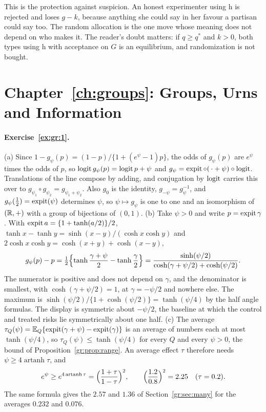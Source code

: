 This is the protection against suspicion. An honest experimenter using h is rejected and loses $g-k$, because anything she could say in her favour a partisan could say too. The random allocation is the one move whose meaning does not depend on who makes it. The reader's doubt matters: if $q\ge q^*$ and $k>0$, both types using h with acceptance on $G$ is an equilibrium, and randomization is not bought.

\section*{Chapter~\ref{ch:groups}: Groups, Urns and Information}

\paragraph{Exercise~\ref{ex:gr:1}.} (a) Since $1-g_\psi(p)=(1-p)/\{1+(e^{\psi}-1)p\}$, the odds of $g_\psi(p)$ are $e^{\psi}$ times the odds of $p$, so $\operatorname{logit} g_\psi(p)=\operatorname{logit} p+\psi$ and $g_\psi=\operatorname{expit}\circ(\,\cdot+\psi)\circ\operatorname{logit}$. Translations of the line compose by adding, and conjugation by $\operatorname{logit}$ carries this over to $g_{\psi_1}\circ g_{\psi_2}=g_{\psi_1+\psi_2}$. Also $g_0$ is the identity, $g_{-\psi}=g_\psi^{-1}$, and $g_\psi(\tfrac12)=\operatorname{expit}(\psi)$ determines $\psi$, so $\psi\mapsto g_\psi$ is one to one and an isomorphism of $(\mathbb{R},+)$ with a group of bijections of $(0,1)$. (b) Take $\psi>0$ and write $p=\operatorname{expit}\gamma$. With $\operatorname{expit} a=\{1+\tanh(a/2)\}/2$, $\tanh x-\tanh y=\sinh(x-y)/(\cosh x\cosh y)$ and $2\cosh x\cosh y=\cosh(x+y)+\cosh(x-y)$,
\[
g_\psi(p)-p=\tfrac12\Bigl\{\tanh\frac{\gamma+\psi}{2}-\tanh\frac{\gamma}{2}\Bigr\}=\frac{\sinh(\psi/2)}{\cosh(\gamma+\psi/2)+\cosh(\psi/2)}.
\]
The numerator is positive and does not depend on $\gamma$, and the denominator is smallest, with $\cosh(\gamma+\psi/2)=1$, at $\gamma=-\psi/2$ and nowhere else. The maximum is $\sinh(\psi/2)/\{1+\cosh(\psi/2)\}=\tanh(\psi/4)$ by the half angle formulas. The display is symmetric about $-\psi/2$, the baseline at which the control and treated risks lie symmetrically about one half. (c) The average $\tau_Q(\psi)=\mathbb{E}_Q\{\operatorname{expit}(\gamma+\psi)-\operatorname{expit}(\gamma)\}$ is an average of numbers each at most $\tanh(\psi/4)$, so $\tau_Q(\psi)\le\tanh(\psi/4)$ for every $Q$ and every $\psi>0$, the bound of Proposition~\ref{gr:prop:range}. An average effect $\tau$ therefore needs $\psi\ge4\operatorname{artanh}\tau$, and
\[
e^{\psi}\ge e^{4\operatorname{artanh}\tau}=\Bigl(\frac{1+\tau}{1-\tau}\Bigr)^2,\qquad\Bigl(\frac{1.2}{0.8}\Bigr)^2=2.25\quad(\tau=0.2).
\]
The same formula gives the $2.57$ and $1.36$ of Section~\ref{gr:sec:many} for the averages $0.232$ and $0.076$.

